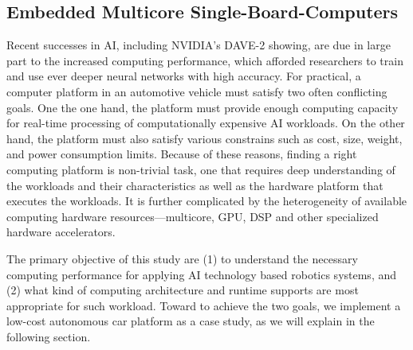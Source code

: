 



\subsection{Embedded Multicore Single-Board-Computers}

Recent successes in AI, including NVIDIA's DAVE-2 showing, are due
in large part to the increased computing performance,
which afforded researchers to train and use ever deeper neural networks with
high accuracy. For practical, a computer platform in an automotive vehicle must
satisfy two often conflicting goals. One the one hand, the platform must provide
enough computing capacity for real-time processing of computationally expensive
AI workloads. On the other hand, the platform must also satisfy various
constrains such as cost, size, weight, and power consumption limits.
Because of these reasons, finding a right computing platform is non-trivial
task, one that requires deep understanding of the workloads and their
characteristics as well as the hardware platform that executes the
workloads. It is further complicated by the heterogeneity of available
computing hardware resources---multicore, GPU, DSP and other specialized
hardware accelerators.

The primary objective of this study are (1) to understand the necessary
computing performance for applying AI technology based robotics systems, and
(2) what kind of computing architecture and runtime supports
are most appropriate for such workload.
Toward to achieve the two goals, we implement a low-cost autonomous
car platform as a case study, as we will explain in the following
section.
